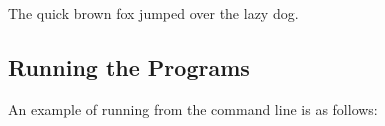 \documentclass{l4proj}
\begin{document}
The quick brown fox jumped over the lazy dog.

\begin{appendices}

\chapter{Running the Programs}
An example of running from the command line is as follows:
\begin{verbatim}
\end{verbatim}

\end{appendices}




\end{document}
